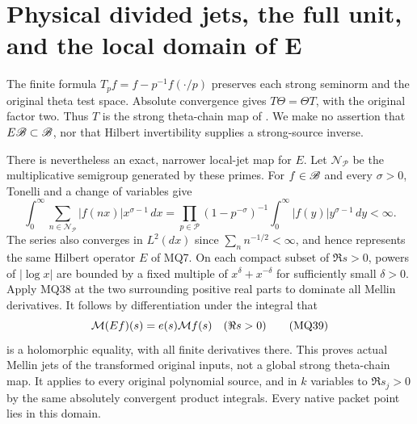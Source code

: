 \section{Physical divided jets, the full unit, and the local domain of E}
The finite formula $T_pf=f-p^{-1}f(\cdot/p)$ preserves each
strong seminorm and the original theta test space. Absolute
convergence gives $T\Theta=\Theta T$, with the original factor
two. Thus $T$ is the strong theta-chain map of \cite{swmix:SD}.
We make no assertion that $E\mathscr B\subset\mathscr B$, nor that Hilbert
invertibility supplies a strong-source inverse.

There is nevertheless an exact, narrower local-jet map for $E$.
Let $\mathcal N_{\mathcal P}$ be the multiplicative semigroup
generated by these primes. For $f\in\mathscr B$ and every $\sigma>0$,
Tonelli and a change of variables give
\[
 \int_0^\infty\sum_{n\in\mathcal N_{\mathcal P}}
 |f(nx)|x^{\sigma-1}\,dx
 =\prod_{p\in\mathcal P}(1-p^{-\sigma})^{-1}
       \int_0^\infty|f(y)|y^{\sigma-1}\,dy<\infty.           \tag{MQ38}
\]
The series also converges in $L^2(dx)$ since
$\sum_n n^{-1/2}<\infty$, and hence represents the same Hilbert
operator $E$ of MQ7. On each compact subset of $\Re s>0$, powers
of $|\log x|$ are bounded by a fixed multiple of
$x^\delta+x^{-\delta}$ for sufficiently small $\delta>0$.
Apply MQ38 at the two surrounding positive real parts to dominate
all Mellin derivatives. It follows by differentiation under the
integral that
\[
 \mathcal M(Ef)(s)=e(s)\mathcal M f(s)\quad(\Re s>0)                      \tag{MQ39}
\]
is a holomorphic equality, with all finite derivatives there. This
proves actual Mellin jets of the transformed original inputs,
not a global strong theta-chain map. It applies to every original
polynomial source, and in $k$ variables to $\Re s_j>0$ by the
same absolutely convergent product integrals. Every native packet
point lies in this domain.

